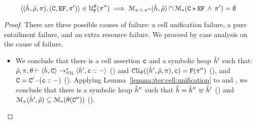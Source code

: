 \begin{lemma}
$$
\unificationfullfail{\sheap, \sstore, \pc}{\cells, \efs, \pfs'}{\subst}{\pc''} 
%
 \implies \smodels{\sheap, \sstore}{\pc \, \wedge \, \pc''} \cap \sepmodels{\cells \sep \efs \, \wedge \, \pc'} = \emptyset
 $$
\end{lemma}
\begin{proof}
There are three possible causes of failure: a cell unification failure, a pure entailment failure, 
and an extra resource failure. We proceed by case analysis on the cause of failure. 
\begin{itemize}
    \item {} We conclude that there is a cell assertion $\cell$ 
              and a symbolic heap $\sheap'$ such that:  
              $\cellunificationiter{\sheap, \cells}{\sheap', \cell \lstcons -}{\sstore, \pc, \subst}$ () 
              and $\unification{\sheap', \sstore, \pc}{\cell}{\subst} = \uno{\pc''}$ (), and  
              $\cells = \cells' \lstconcat (\cell \lstcons -)$ (). Applying Lemma~\ref{lemma:iter:cell:unification}
              to  and , we conclude that there is a symbolic heap $\sheap''$ such that $\sheap = \sheap'' \dunion \sheap'$ ()
              and $\smodels{\sheap', \sstore}{\pc} \subseteq \sepmodels{\subst(\cells'')}$ (). 
              
\end{itemize}
\end{proof} 
% 
 
% 
 
